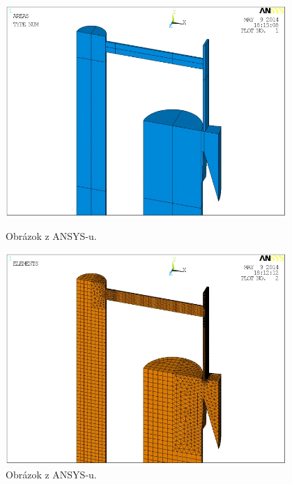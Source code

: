 \begin{figure}[!h]
	\centering
	\vspace{-5pt}
	\begin{minipage}{.5\textwidth}
		\centering
		\includegraphics[width=0.95\textwidth]{vzduchovod1}
		\vspace{-5pt}
		\caption{Obrázok z ANSYS-u.}
		\label{fig:vzduchovod_geom}
	\end{minipage}%
	\begin{minipage}{.5\textwidth}
		\centering
		\includegraphics[width=0.95\textwidth]{vzduchovod2}
		\vspace{-5pt}
		\caption{Obrázok z ANSYS-u.}
		\label{fig:vzduchovod_mesh}
	\end{minipage}
	\vspace{-5pt}
\end{figure}

